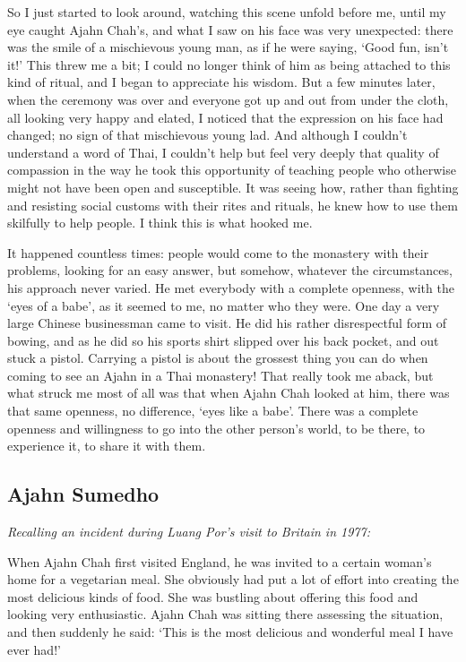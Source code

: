 So I just started to look around, watching this scene unfold before me, 
until my eye caught Ajahn Chah's, and what I saw on his face was very
unexpected: there was the smile of a mischievous young man, as if he
were saying, `Good fun, isn't it!' This threw me a bit; I could no
longer think of him as being attached to this kind of ritual, and I
began to appreciate his wisdom. But a few minutes later, when the
ceremony was over and everyone got up and out from under the cloth, all
looking very happy and elated, I noticed that the expression on his face
had changed; no sign of that mischievous young lad. And although I
couldn't understand a word of Thai, I couldn't help but feel very deeply
that quality of compassion in the way he took this opportunity of
teaching people who otherwise might not have been open and susceptible. 
It was seeing how, rather than fighting and resisting social customs
with their rites and rituals, he knew how to use them skilfully to help
people. I think this is what hooked me. 

It happened countless times: people would come to the monastery with
their problems, looking for an easy answer, but somehow, whatever the
circumstances, his approach never varied. He met everybody with a
complete openness, with the `eyes of a babe', as it seemed to me, no
matter who they were. One day a very large Chinese businessman came to
visit. He did his rather disrespectful form of bowing, and as he did so
his sports shirt slipped over his back pocket, and out stuck a pistol. 
Carrying a pistol is about the grossest thing you can do when coming to
see an Ajahn in a Thai monastery! That really took me aback, but what
struck me most of all was that when Ajahn Chah looked at him, there was
that same openness, no difference, `eyes like a babe'. There was a
complete openness and willingness to go into the other person's world, 
to be there, to experience it, to share it with them. 

\subsection{Ajahn Sumedho}

\emph{Recalling an incident during Luang Por's visit to Britain in 1977:}

When Ajahn Chah first visited England, he was invited to a certain
woman's home for a vegetarian meal. She obviously had put a lot of
effort into creating the most delicious kinds of food. She was bustling
about offering this food and looking very enthusiastic. Ajahn Chah was
sitting there assessing the situation, and then suddenly he said: `This
is the most delicious and wonderful meal I have ever had!'

